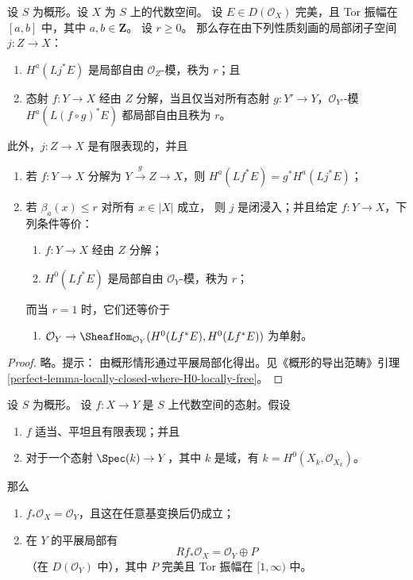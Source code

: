 \begin{lemma}
\label{lemma-locally-closed-where-H0-locally-free}
设 $S$ 为概形。设 $X$ 为 $S$ 上的代数空间。
设 $E \in D(\mathcal{O}_X)$ 完美，且 Tor 振幅在
$[a, b]$ 中，其中 $a, b \in \mathbf{Z}$。
设 $r \geq 0$。
那么存在由下列性质刻画的局部闭子空间 $j : Z \to X$：
\begin{enumerate}
\item $H^a(Lj^*E)$ 是局部自由 $\mathcal{O}_Z$-模，秩为 $r$；且
\item 态射 $f : Y \to X$ 经由 $Z$ 分解，当且仅当对所有态射
$g : Y' \to Y$，$\mathcal{O}_{Y'}$-模
$H^a(L(f \circ g)^*E)$ 都局部自由且秩为 $r$。
\end{enumerate}
此外，$j : Z \to X$ 是有限表现的，并且
\begin{enumerate}
\item[(3)] 若 $f : Y \to X$ 分解为
$Y \xrightarrow{g} Z \to X$，则
$H^a(Lf^*E) = g^*H^a(Lj^*E)$；
\item[(4)] 若 $\beta_a(x) \leq r$ 对所有 $x \in |X|$ 成立，
则 $j$ 是闭浸入；并且给定 $f : Y \to X$，下列条件等价：
\begin{enumerate}
\item $f : Y \to X$ 经由 $Z$ 分解；
\item $H^0(Lf^*E)$ 是局部自由 $\mathcal{O}_Y$-模，秩为 $r$；%
\end{enumerate}
而当 $r = 1$ 时，它们还等价于
\begin{enumerate}
\item[(c)] $\mathcal{O}_Y \to
\SheafHom_{\mathcal{O}_Y}(H^0(Lf^*E), H^0(Lf^*E))$
为单射。
\end{enumerate}
\end{enumerate}
\end{lemma}

\begin{proof}
略。提示：
由概形情形通过平展局部化得出。见《概形的导出范畴》引理
\ref{perfect-lemma-locally-closed-where-H0-locally-free}。
\end{proof}

\begin{lemma}
\label{lemma-proper-flat-h0}
设 $S$ 为概形。
设 $f : X \to Y$ 是 $S$ 上代数空间的态射。假设
\begin{enumerate}
\item $f$ 适当、平坦且有限表现；并且
\item 对于一个态射 $\Spec(k) \to Y$，其中 $k$ 是域，有 %
$k = H^0(X_k, \mathcal{O}_{X_k})$。
\end{enumerate}
那么
\begin{enumerate}
\item[(a)] $f_*\mathcal{O}_X = \mathcal{O}_Y$，且这在任意基变换后仍成立；
\item[(b)] 在 $Y$ 的平展局部有
$$
Rf_*\mathcal{O}_X = \mathcal{O}_Y \oplus P
$$
（在 $D(\mathcal{O}_Y)$ 中），其中 $P$ 完美且 Tor 振幅在
$[1, \infty)$ 中。
\end{enumerate}
\end{lemma}

